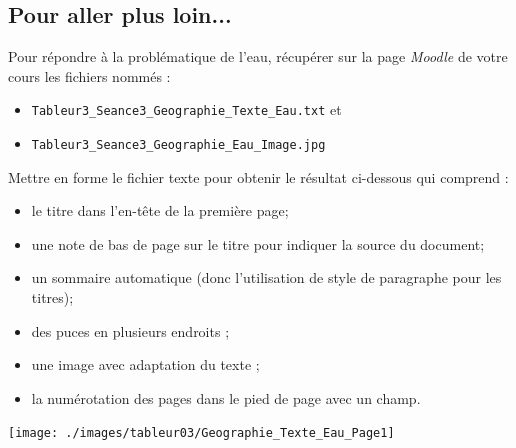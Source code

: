 \subsection{Pour aller plus loin...}

Pour répondre à la problématique de l'eau, récupérer sur la page \emph{Moodle} de votre cours les fichiers nommés :
\begin{itemize}
\item \texttt{Tableur3\_Seance3\_Geographie\_Texte\_Eau.txt} et 
\item \texttt{Tableur3\_Seance3\_Geographie\_Eau\_Image.jpg}
\end{itemize}

\vspace{6pt}

Mettre en forme le fichier texte pour obtenir le résultat ci-dessous qui comprend :
\begin{itemize}
\item le titre dans l'en-tête de la première page;
\item une note de bas de page sur le titre pour indiquer la source du document;
\item un sommaire automatique (donc l'utilisation de style de paragraphe pour les titres);
\item des puces en plusieurs endroits ;
\item une image avec adaptation du texte ; 
\item la numérotation des pages dans le pied de page avec un champ.
\end{itemize}

\begin{center}
\texttt{[image: ./images/tableur03/Geographie\_Texte\_Eau\_Page1]}
\end{center}

\vspace{-4em}






